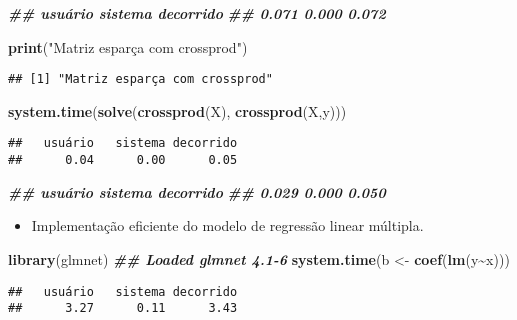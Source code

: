 \documentclass[
]{article}
\newenvironment{Shaded}{\begin{snugshade}}{\end{snugshade}}
\newcommand{\DocumentationTok}[1]{\textcolor[rgb]{0.56,0.35,0.01}{\textbf{\textit{#1}}}}
\newcommand{\FunctionTok}[1]{\textcolor[rgb]{0.13,0.29,0.53}{\textbf{#1}}}
\newcommand{\NormalTok}[1]{#1}
\newcommand{\OtherTok}[1]{\textcolor[rgb]{0.56,0.35,0.01}{#1}}
\newcommand{\SpecialCharTok}[1]{\textcolor[rgb]{0.81,0.36,0.00}{\textbf{#1}}}
\newcommand{\StringTok}[1]{\textcolor[rgb]{0.31,0.60,0.02}{#1}}
\providecommand{\tightlist}{%
  \setlength{\itemsep}{0pt}\setlength{\parskip}{0pt}}
\begin{document}
\begin{Shaded}
\begin{Highlighting}[]
\DocumentationTok{\#\# usuário sistema decorrido}
\DocumentationTok{\#\# 0.071 0.000 0.072}

\FunctionTok{print}\NormalTok{(}\StringTok{"Matriz esparça com crossprod"}\NormalTok{)}
\end{Highlighting}
\end{Shaded}

\begin{verbatim}
## [1] "Matriz esparça com crossprod"
\end{verbatim}

\begin{Shaded}
\begin{Highlighting}[]
\FunctionTok{system.time}\NormalTok{(}\FunctionTok{solve}\NormalTok{(}\FunctionTok{crossprod}\NormalTok{(X), }\FunctionTok{crossprod}\NormalTok{(X,y)))}
\end{Highlighting}
\end{Shaded}

\begin{verbatim}
##   usuário   sistema decorrido 
##      0.04      0.00      0.05
\end{verbatim}

\begin{Shaded}
\begin{Highlighting}[]
\DocumentationTok{\#\# usuário sistema decorrido}
\DocumentationTok{\#\# 0.029 0.000 0.050}
\end{Highlighting}
\end{Shaded}

\begin{itemize}
\tightlist
\item
  Implementação eficiente do modelo de regressão linear múltipla.
\end{itemize}

\begin{Shaded}
\begin{Highlighting}[]
\FunctionTok{library}\NormalTok{(glmnet)}
\DocumentationTok{\#\# Loaded glmnet 4.1{-}6}
\FunctionTok{system.time}\NormalTok{(b }\OtherTok{\textless{}{-}} \FunctionTok{coef}\NormalTok{(}\FunctionTok{lm}\NormalTok{(y}\SpecialCharTok{\textasciitilde{}}\NormalTok{x)))}
\end{Highlighting}
\end{Shaded}

\begin{verbatim}
##   usuário   sistema decorrido 
##      3.27      0.11      3.43
\end{verbatim}
\end{document}
